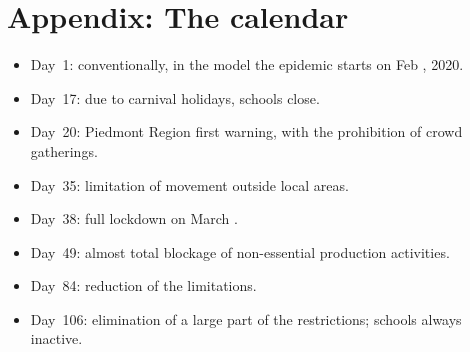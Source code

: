\documentclass[graybox]{svmult}
\begin{document}
\section{Appendix: The calendar}
\label{appCalendar}

\begin{itemize}
\setlength{\itemsep}{0pt}

\item Day~1: conventionally, in the model the epidemic starts on Feb , 2020.

\item Day~17: due to carnival holidays, schools close.

\item Day~20: Piedmont Region first warning, with the prohibition of crowd gatherings.

\item Day~35: limitation of movement outside local areas.

\item Day~38: full lockdown on March .

\item Day~49: almost total blockage of non-essential production activities.

\item Day~84: reduction of the limitations.

\item Day~106: elimination of a large part of the restrictions; schools always inactive.

\end{itemize}








\end{document}
